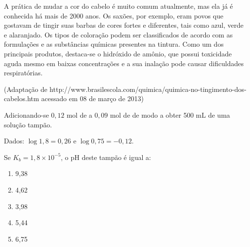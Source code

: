 A prática de mudar a cor do cabelo é muito comum atualmente, mas ela já é conhecida há mais de 2000 anos.
Os saxões, por exemplo, eram povos que gostavam de tingir suas barbas de cores fortes e diferentes, tais como azul, verde e alaranjado.
Os tipos de coloração podem ser classificados de acordo com as formulações e as substâncias químicas presentes na tintura.
Como um dos principais produtos, destaca-se o hidróxido de amônio, que possui toxicidade aguda mesmo em baixas concentrações e a sua inalação pode causar dificuldades respiratórias.

{\footnotesize (Adaptação de http://www.brasilescola.com/quimica/quimica-no-tingimento-dos-cabelos.htm acessado em 08 de março de 2013)}

Adicionando-se $0,12$ mol de  a $0,09$ mol de  de modo a obter 500 mL de
uma solução tampão.

Dados: $\log 1,8 = 0,26$ e $\log 0,75 = -0,12$.

Se $K_b = 1,8 \times 10^{-5}$, o pH deste tampão é igual a:

\begin{enumerate}[label = (\alph*), itemjoin={\quad}]
	\item 9,38
	\item 4,62
	\item 3,98
	\item 5,44
	\item 6,75
\end{enumerate}
